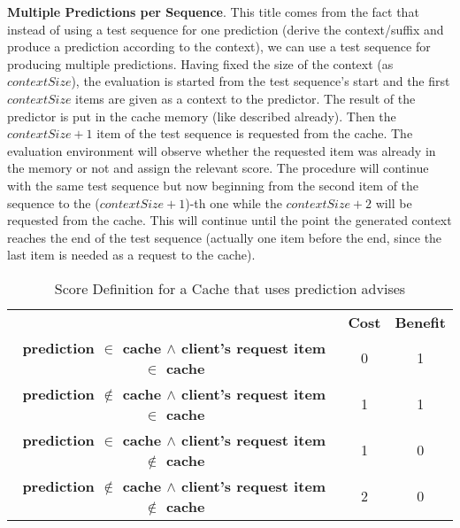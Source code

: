 \par\textbf{Multiple Predictions per Sequence}. This title comes from the fact that instead of using a test sequence for one prediction (derive the context/suffix and produce a prediction according to the context), we can use a test sequence for producing multiple predictions. Having fixed the size of the context (as $contextSize$), the evaluation is started from the test sequence's start and the first $contextSize$ items are given as a context to the predictor. The result of the predictor is put in the cache memory (like described already). Then the $contextSize+1$ item of the test sequence is requested from the cache. The evaluation environment will observe whether the requested item was already in the memory or not and assign the relevant score. The procedure will continue with the same test sequence but now beginning from the second item of the sequence to the ($contextSize+1$)-th one while the $contextSize+2$ will be requested from the cache. This will continue until the point the generated context reaches the end of the test sequence (actually one item before the end, since the last item is needed as a request to the cache).
\begin{table}[h!]
\centering
\begin{tabular}{ |c|c|c| } 
 \hline
  & \textbf{Cost} & \textbf{Benefit} \\ 
 \textbf{prediction \(\in\) cache \(\wedge\) client's request item \(\in\) cache} & 0 & 1 \\ 
 \textbf{prediction \(\notin\) cache \(\wedge\) client's request item \(\in\) cache} & 1 & 1 \\
 \textbf{prediction \(\in\) cache \(\wedge\) client's request item \(\notin\) cache} & 1 & 0 \\
 \textbf{prediction \(\notin\) cache \(\wedge\) client's request item \(\notin\) cache} & 2 & 0 \\ 
 \hline
\end{tabular}
\caption{Score Definition for a Cache that uses prediction advises}
\label{table:cache_score}
\end{table}


